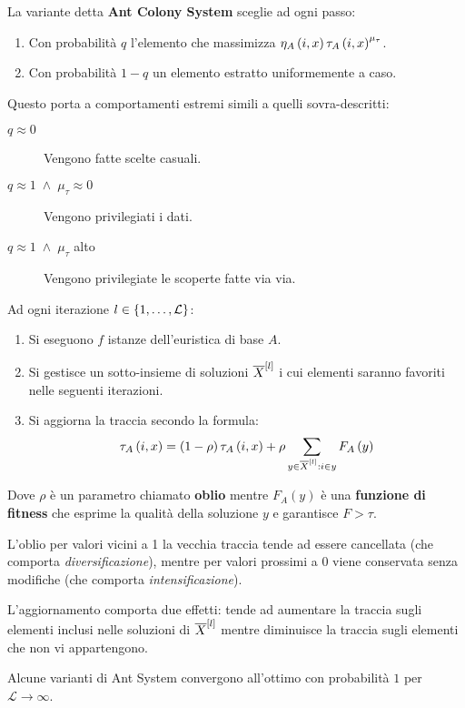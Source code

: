 \documentclass[\main/main.tex]{subfiles}
\begin{document}
\begin{multicols}{2}
\begin{definition}
    La variante detta \textbf{Ant Colony System} sceglie ad ogni passo:
    \begin{enumerate}
        \item Con probabilità \(q\) l'elemento che massimizza \(\eta_A\left(i, x\right) \tau_A\left(i, x\right)^{\mu_\tau}\).
        \item Con probabilità \(1-q\) un elemento estratto uniformemente a caso.
    \end{enumerate}
    Questo porta a comportamenti estremi simili a quelli sovra-descritti:
    \begin{description}
        \item[\(q\approx 0\)] Vengono fatte scelte casuali.
        \item[\(q\approx 1\;\land\;\mu_\tau \approx 0\)] Vengono privilegiati i dati.
        \item[\(q\approx 1\;\land\;\mu_\tau\) alto] Vengono privilegiate le scoperte fatte via via.
    \end{description}
\end{definition}
\begin{observation}
    Ad ogni iterazione \(l \in \left\{1, \ldots, \mathcal{L}\right\}\):
    \begin{enumerate}
        \item Si eseguono \(f\) istanze dell'euristica di base \(A\).
        \item Si gestisce un sotto-insieme di soluzioni \(\overline{X}^{\left[l\right]}\) i cui elementi saranno favoriti nelle seguenti iterazioni.
        \item Si aggiorna la traccia secondo la formula:
        \[
            \tau_A\left(i, x\right) = \left(1-\rho\right)\tau_A\left(i, x\right) + \rho \sum_{y \in \overline{X}^{\left[l\right]}: i \in y} F_A\left(y\right)
        \]
    \end{enumerate}
    Dove \(\rho\) è un parametro chiamato \textbf{oblio} mentre \(F_A(y)\) è una \textbf{funzione di fitness} che esprime la qualità della soluzione \(y\) e garantisce \(F>\tau\).
\end{observation}
\begin{definition}[Oblio]
    L'oblio per valori vicini a 1 la vecchia traccia tende ad essere cancellata (che comporta \textit{diversificazione}), mentre per valori prossimi a 0 viene conservata senza modifiche (che comporta \textit{intensificazione}).
\end{definition}
\begin{observation}
    L'aggiornamento comporta due effetti: tende ad aumentare la traccia sugli elementi inclusi nelle soluzioni di \(\overline{X}^{\left[l\right]}\) mentre diminuisce la traccia sugli elementi che non vi appartengono.
\end{observation}
\begin{theorem}
    Alcune varianti di Ant System convergono all'ottimo con probabilità \(1\) per \(\mathcal{L}\rightarrow \infty\).
\end{theorem}
\end{multicols}
\end{document}
